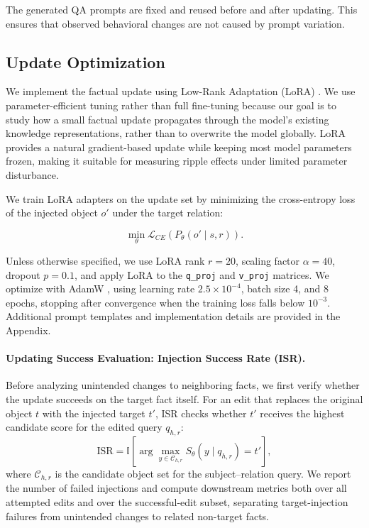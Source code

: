 The generated QA prompts are fixed and reused before and after updating. This ensures that observed behavioral changes are not caused by prompt variation.

\subsection{Update Optimization}

We implement the factual update using Low-Rank Adaptation (LoRA) \cite{hu2021lora}. We use parameter-efficient tuning rather than full fine-tuning because our goal is to study how a small factual update propagates through the model's existing knowledge representations, rather than to overwrite the model globally. LoRA provides a natural gradient-based update while keeping most model parameters frozen, making it suitable for measuring ripple effects under limited parameter disturbance.

We train LoRA adapters on the update set by minimizing the cross-entropy loss of the injected object $o'$ under the target relation:

\[
\min_{\theta} \mathcal{L}_{CE}(P_{\theta}(o' \mid s,r)).
\]

Unless otherwise specified, we use LoRA rank $r=20$, scaling factor $\alpha=40$, dropout $p=0.1$, and apply LoRA to the \texttt{q\_proj} and \texttt{v\_proj} matrices. We optimize with AdamW \cite{loshchilov2019decoupled}, using learning rate $2.5 \times 10^{-4}$, batch size 4, and 8 epochs, stopping after convergence when the training loss falls below $10^{-3}$. Additional prompt templates and implementation details are provided in the Appendix.


\paragraph{Updating Success Evaluation: Injection Success Rate (ISR).}
Before analyzing unintended changes to neighboring facts, we first verify whether the update succeeds on the target fact itself. For an edit that replaces the original object $t$ with the injected target $t'$, ISR checks whether $t'$ receives the highest candidate score for the edited query $q_{h,r}$:
\begin{equation}
    \text{ISR}
    =
    \mathbb{I}
    \left[
    \arg\max_{y \in \mathcal{C}_{h,r}}
    S_\theta(y \mid q_{h,r})
    =
    t'
    \right],
    \label{eq:isr}
\end{equation}
where $\mathcal{C}_{h,r}$ is the candidate object set for the subject--relation query. We report the number of failed injections and compute downstream metrics both over all attempted edits and over the successful-edit subset, separating target-injection failures from unintended changes to related non-target facts.

